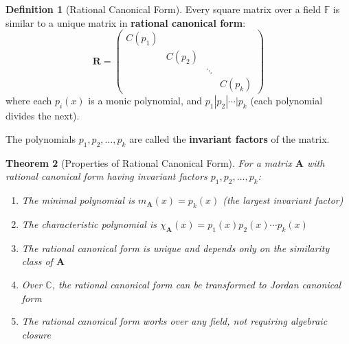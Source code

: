 \documentclass[12pt]{article}
\numberwithin{equation}{section}
\newcommand{\mat}[1]{\mathbf{#1}}        %
\theoremstyle{plain}
\newtheorem{theorem}{Theorem}[section]
\theoremstyle{definition}
\newtheorem{definition}[theorem]{Definition}
\theoremstyle{remark}
\begin{document}
\begin{definition}[Rational Canonical Form]
Every square matrix over a field $\mathbb{F}$ is similar to a unique matrix in \textbf{rational canonical form}:
$$\mat{R} = \begin{pmatrix}
C(p_1) & & & \\
& C(p_2) & & \\
& & \ddots & \\
& & & C(p_k)
\end{pmatrix}$$
where each $p_i(x)$ is a monic polynomial, and $p_1 | p_2 | \cdots | p_k$ (each polynomial divides the next).

The polynomials $p_1, p_2, \ldots, p_k$ are called the \textbf{invariant factors} of the matrix.
\end{definition}

\begin{theorem}[Properties of Rational Canonical Form]
For a matrix $\mat{A}$ with rational canonical form having invariant factors $p_1, p_2, \ldots, p_k$:
\begin{enumerate}
\item The minimal polynomial is $m_{\mat{A}}(x) = p_k(x)$ (the largest invariant factor)
\item The characteristic polynomial is $\chi_{\mat{A}}(x) = p_1(x)p_2(x) \cdots p_k(x)$
\item The rational canonical form is unique and depends only on the similarity class of $\mat{A}$
\item Over $\mathbb{C}$, the rational canonical form can be transformed to Jordan canonical form
\item The rational canonical form works over any field, not requiring algebraic closure
\end{enumerate}
\end{theorem}
\end{document}
